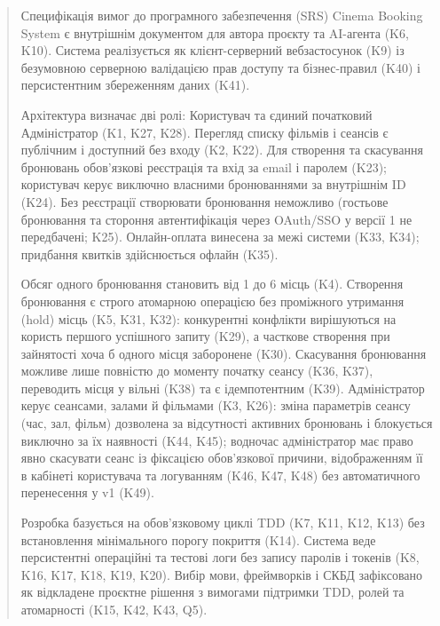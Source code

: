 \documentclass[profile=ieee,lang=uk]{skedreport}
\begin{document}
\skedmaketitle

\begin{abstract}
Специфікація вимог до програмного забезпечення (SRS) Cinema Booking System є внутрішнім документом для автора проєкту та AI-агента (K6, K10). Система реалізується як клієнт-серверний вебзастосунок (K9) із безумовною серверною валідацією прав доступу та бізнес-правил (K40) і персистентним збереженням даних (K41).

Архітектура визначає дві ролі: Користувач та єдиний початковий Адміністратор (K1, K27, K28). Перегляд списку фільмів і сеансів є публічним і доступний без входу (K2, K22). Для створення та скасування бронювань обов'язкові реєстрація та вхід за email і паролем (K23); користувач керує виключно власними бронюваннями за внутрішнім ID (K24). Без реєстрації створювати бронювання неможливо (гостьове бронювання та стороння автентифікація через OAuth/SSO у версії 1 не передбачені; K25). Онлайн-оплата винесена за межі системи (K33, K34); придбання квитків здійснюється офлайн (K35).

Обсяг одного бронювання становить від 1 до 6 місць (K4). Створення бронювання є строго атомарною операцією без проміжного утримання (hold) місць (K5, K31, K32): конкурентні конфлікти вирішуються на користь першого успішного запиту (K29), а часткове створення при зайнятості хоча б одного місця заборонене (K30). Скасування бронювання можливе лише повністю до моменту початку сеансу (K36, K37), переводить місця у вільні (K38) та є ідемпотентним (K39). Адміністратор керує сеансами, залами й фільмами (K3, K26): зміна параметрів сеансу (час, зал, фільм) дозволена за відсутності активних бронювань і блокується виключно за їх наявності (K44, K45); водночас адміністратор має право явно скасувати сеанс із фіксацією обов'язкової причини, відображенням її в кабінеті користувача та логуванням (K46, K47, K48) без автоматичного перенесення у v1 (K49).

Розробка базується на обов'язковому циклі TDD (K7, K11, K12, K13) без встановлення мінімального порогу покриття (K14). Система веде персистентні операційні та тестові логи без запису паролів і токенів (K8, K16, K17, K18, K19, K20). Вибір мови, фреймворків і СКБД зафіксовано як відкладене проєктне рішення з вимогами підтримки TDD, ролей та атомарності (K15, K42, K43, Q5).
\end{abstract}

\skedtoc











\skedappendix

\end{document}
